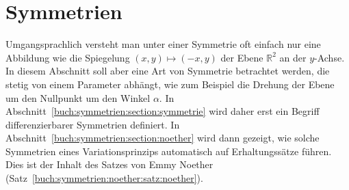 %
%
%
\chapter{Symmetrien
\label{buch:chapter:symmetrien}}
Umgangsprachlich versteht man unter einer Symmetrie oft einfach  nur
eine Abbildung wie die Spiegelung
\(
(x,y)\mapsto (-x,y)
\)
der Ebene $\mathbb{R}^2$ an der $y$-Achse.
In diesem Abschnitt soll aber eine Art von Symmetrie betrachtet
werden, die stetig von einem Parameter abhängt, wie zum Beispiel
die Drehung der Ebene um den Nullpunkt um den Winkel $\alpha$.
In Abschnitt~\ref{buch:symmetrien:section:symmetrie} wird daher
erst ein Begriff differenzierbarer Symmetrien definiert.
In Abschnitt~\ref{buch:symmetrien:section:noether} wird dann gezeigt,
wie solche Symmetrien eines Variationsprinzips automatisch auf
Erhaltungssätze führen.
Dies ist der Inhalt des Satzes von Emmy Noether
(Satz~\ref{buch:symmetrien:noether:satz:noether}).





\uebungsabschnitt

\begin{uebungsaufgaben}
\end{uebungsaufgaben}
\enduebungsabschnitt

